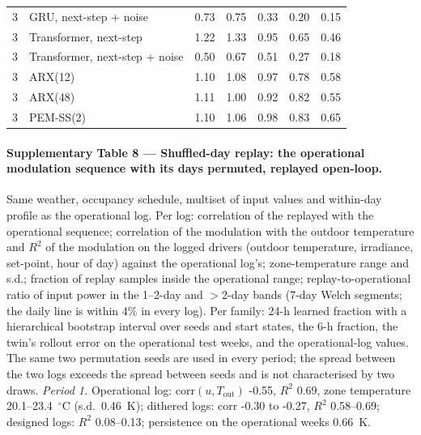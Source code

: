 \documentclass[11pt]{article}
\begin{document}
\begin{center}
{\begin{tabular}{llccccc}
3 & GRU, next-step + noise & 0.73 & 0.75 & 0.33 & 0.20 & 0.15\\
3 & Transformer, next-step & 1.22 & 1.33 & 0.95 & 0.65 & 0.46\\
3 & Transformer, next-step + noise & 0.50 & 0.67 & 0.51 & 0.27 & 0.18\\
3 & ARX(12) & 1.10 & 1.08 & 0.97 & 0.78 & 0.58\\
3 & ARX(48) & 1.11 & 1.00 & 0.92 & 0.82 & 0.55\\
3 & PEM-SS(2) & 1.10 & 1.06 & 0.98 & 0.83 & 0.65\\
\bottomrule\end{tabular}}\end{center}

\paragraph{Supplementary Table 8 --- Shuffled-day replay: the operational modulation sequence with its days permuted, replayed open-loop.} Same weather, occupancy schedule, multiset of input values and within-day profile as the operational log. Per log: correlation of the replayed with the operational sequence; correlation of the modulation with the outdoor temperature and $R^2$ of the modulation on the logged drivers (outdoor temperature, irradiance, set-point, hour of day) against the operational log's; zone-temperature range and s.d.; fraction of replay samples inside the operational range; replay-to-operational ratio of input power in the 1--2-day and $>$2-day bands (7-day Welch segments; the daily line is within 4\% in every log). Per family: 24-h learned fraction with a hierarchical bootstrap interval over seeds and start states, the 6-h fraction, the twin's rollout error on the operational test weeks, and the operational-log values. The same two permutation seeds are used in every period; the spread between the two logs exceeds the spread between seeds and is not characterised by two draws.
\emph{Period 1.} Operational log: corr$(u,T_{\mathrm{out}})$ -0.55, $R^2$ 0.69, zone temperature 20.1--23.4~$^\circ$C (s.d.\ 0.46~K); dithered logs: corr -0.30 to -0.27, $R^2$ 0.58--0.69; designed logs: $R^2$ 0.08--0.13; persistence on the operational weeks 0.66~K.
\begin{center}\scriptsize{}\end{center}
\end{document}
